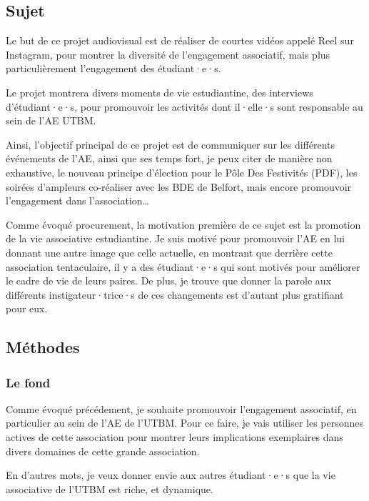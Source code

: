 
\subsection{Sujet}\label{subsec:sujet}

Le but de ce projet audiovisual est de réaliser de courtes vidéos appelé Reel sur Instagram, pour montrer la diversité de l'engagement associatif, mais plus particulièrement l'engagement des étudiant·e·s.

Le projet montrera divers moments de vie estudiantine, des interviews d'étudiant·e·s, pour promouvoir les activités dont il·elle·s sont responsable au sein de l'\gls{AE} \gls{UTBM}.

Ainsi, l'objectif principal de ce projet est de communiquer sur les différents événements de l'\gls{AE}, ainsi que ses temps fort, je peux citer de manière non exhaustive, le nouveau principe d'élection pour le Pôle Des Festivités (PDF), les soirées d'ampleurs co-réaliser avec les BDE de Belfort, mais encore promouvoir l'engagement dans l'association\ldots

Comme évoqué procurement, la motivation première de ce sujet est la promotion de la vie associative estudiantine.
Je suis motivé pour promouvoir l'\gls{AE} en lui donnant une autre image que celle actuelle, en montrant que derrière cette association tentaculaire, il y a des étudiant·e·s qui sont motivés pour améliorer le cadre de vie de leurs paires.
De plus, je trouve que donner la parole aux différents instigateur·trice·s de ces changements est d'autant plus gratifiant pour eux.

\subsection{Méthodes}\label{subsec:methodes}

\subsubsection{Le fond}

Comme évoqué précédement, je souhaite promouvoir l'engagement associatif, en particulier au sein de l'\gls{AE} de l'\gls{UTBM}.
Pour ce faire, je vais utiliser les personnes actives de cette association pour montrer leurs implications exemplaires dans divers domaines de cette grande association.

En d'autres mots, je veux donner envie aux autres étudiant·e·s que la vie associative de l'\gls{UTBM} est riche, et dynamique.

